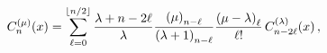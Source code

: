 \[\mathop{C^{(\mu)}_{n}\/}\nolimits\!\left(x\right)=\sum_{\ell=0}^{\left\lfloor n%
/2\right\rfloor}\frac{\lambda+n-2\ell}{\lambda}\frac{\left(\mu\right)_{n-\ell}%
}{\left(\lambda+1\right)_{n-\ell}}\frac{\left(\mu-\lambda\right)_{\ell}}{\ell!%
}\mathop{C^{(\lambda)}_{n-2\ell}\/}\nolimits\!\left(x\right),\]
